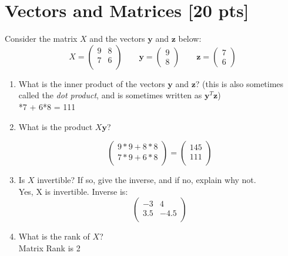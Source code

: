 \documentclass[a4paper]{article}
\theoremstyle{definition}
\newenvironment{soln}{
    \leavevmode\color{blue}\ignorespaces
}{}
\begin{document}
\section{Vectors and Matrices [20 pts]}
Consider the matrix $X$ and the vectors $\mathbf{y}$ and $\textbf{z}$ below:
$$
X = \begin{pmatrix}
9 & 8 \\ 7 & 6 \\
\end{pmatrix}
\qquad \mathbf{y} = \begin{pmatrix}
9 \\ 8
\end{pmatrix} \qquad \mathbf{z} = \begin{pmatrix}
7 \\ 6
\end{pmatrix}
$$
\begin{enumerate}
	\item 	What is the inner product of the vectors $\mathbf{y}$ and $\mathbf{z}$? (this is also sometimes called the \emph{dot product}, and is sometimes written as $\mathbf{y}^T\mathbf{z}$)\\
	    \begin{soln} 9*7 + 6*8 = 111 \end{soln}
	\item 	What is the product $X\mathbf{y}$?\\
	    \begin{soln}  
	    	$$
	    	\begin{pmatrix}
	    		9*9 + 8*8 \\
	    		7*9 + 6*8 \\
	    	\end{pmatrix} = 
    		\begin{pmatrix}
    				145 \\
    				111 \\
    		\end{pmatrix}
    		$$
    	\end{soln}
	\item 	Is $X$ invertible? If so, give the inverse, and if no, explain why not.\\
        \begin{soln}  Yes, X is invertible. Inverse is:
        	$$ 
        	\begin{pmatrix}
        		-3 & 4 \\ 3.5 & -4.5 \\
        	\end{pmatrix}
        	$$
    	 \end{soln}
	\item 	What is the rank of $X$?\\
	    \begin{soln}  Matrix Rank is 2 \end{soln}
\end{enumerate}
\end{document}
